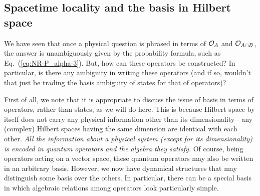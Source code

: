 \documentclass[12pt]{article}
\begin{document}
\subsection{Spacetime locality and the basis in Hilbert space}
\label{subsec:locality-basis}

We have seen that once a physical question is phrased in terms of 
${\cal O}_A$ and ${\cal O}_{A \cap B}$, the answer is unambiguously given 
by the probability formula, such as Eq.~(\ref{eq:NR-P_alpha-3}).  But, 
how can these operators be constructed?  In particular, is there any 
ambiguity in writing these operators (and if so, wouldn't that just 
be trading the basis ambiguity of states for that of operators)?

First of all, we note that it is appropriate to discuss the issue of 
basis in terms of operators, rather than states, as we will do here. 
This is because Hilbert space by itself does not carry any physical 
information other than its dimensionality---any (complex) Hilbert spaces 
having the same dimension are identical with each other.  {\it All the 
information about a physical system (except for its dimensionality) 
is encoded in quantum operators and the algebra they satisfy.}  Of 
course, being operators acting on a vector space, these quantum operators 
may also be written in an arbitrary basis.  However, we now have 
dynamical structures that may distinguish some basis over the others. 
In particular, there can be a special basis in which algebraic relations 
among operators look particularly simple.
\end{document}
